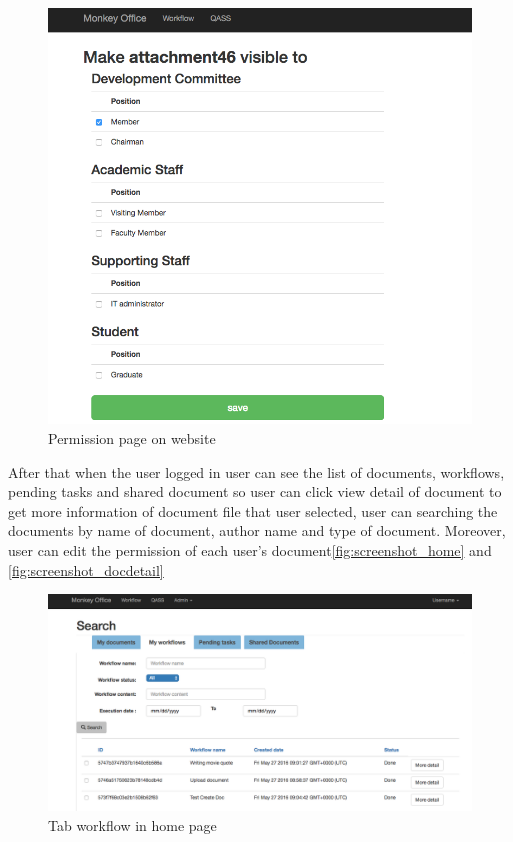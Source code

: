 \begin{figure}[h!]

	\centering
	\includegraphics[scale=0.3]{res/permission_page}
	\caption{Permission page on website}
	\label{fig:screenshot_permission}
\end{figure}


After that when the user logged in 	user can see the list of documents, workflows, pending tasks and shared document so user can click view detail of document to get more information of document file that user selected, user can searching the documents by name of document, author name and type of document. Moreover, user can edit the permission of each user's document\ref{fig:screenshot_home} and \ref{fig:screenshot_docdetail}

\begin{figure}[h!]

	\centering
	\includegraphics[scale=0.3]{res/tab_wf_page}
	\caption{Tab workflow in home page}
	\label{fig:screenshot_tabwf}
\end{figure}

